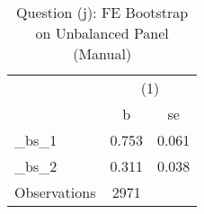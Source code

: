 \begin{table}[htbp]\centering
\def\sym#1{\ifmmode^{#1}\else\(^{#1}\)\fi}
\caption{Question (j): FE Bootstrap on Unbalanced Panel (Manual)}
\begin{tabular}{l*{1}{cc}}
\toprule
                    &\multicolumn{2}{c}{(1)}  \\
                    &           b&          se\\
\midrule
\_bs\_1               &       0.753&       0.061\\
\_bs\_2               &       0.311&       0.038\\
\midrule
Observations        &        2971&            \\
\bottomrule
\end{tabular}
\end{table}
